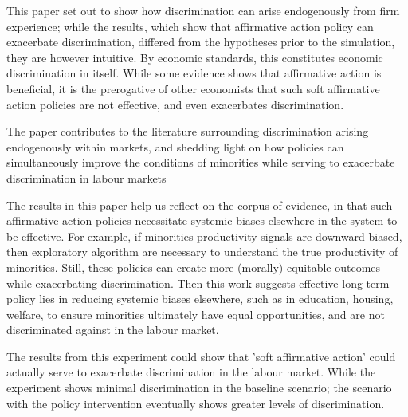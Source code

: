 \documentclass[]{article}
\begin{document}
This paper set out to show how discrimination can arise endogenously from firm experience; while the results, which show that affirmative action policy can exacerbate discrimination, differed from the hypotheses prior to the simulation, they are however intuitive. By economic standards, this constitutes economic discrimination in itself. While some evidence shows that affirmative action is beneficial, it is the prerogative of other economists that such soft affirmative action policies are not effective, and even exacerbates discrimination.


The paper contributes to the literature surrounding discrimination arising endogenously within markets, and shedding light on how policies can simultaneously improve the conditions of minorities while serving to exacerbate discrimination in labour markets


 The results in this paper help us reflect on the corpus of evidence, in that such affirmative action policies necessitate systemic biases elsewhere in the system to be effective. For example, if minorities productivity signals are downward biased, then exploratory algorithm are necessary to understand the true productivity of minorities. Still, these policies can create more (morally) equitable outcomes while exacerbating discrimination. Then this work suggests effective long term policy lies in reducing systemic biases elsewhere, such as in education, housing, welfare, to ensure minorities ultimately have equal opportunities, and are not discriminated against in the labour market.

The results from this experiment could show that 'soft affirmative action' could actually serve to exacerbate discrimination in the labour market. While the experiment shows minimal discrimination in the baseline scenario; the scenario with the policy intervention eventually shows greater levels of discrimination.

\end{document}
